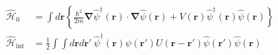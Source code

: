 \documentclass[dvipdfmx, 11pt, a4paper]{jsarticle}
\theoremstyle{definition}
\numberwithin{equation}{section}
\begin{document}
    \begin{definition}[第二量子化ハミルトニアン]
        \begin{equation}
            \begin{aligned}
                \hat{\mathscr{H}}_0 &= \int d\bm{r}\left\{ \frac{\hbar^2}{2m} \bm{\nabla}\hat{\psi}^\dagger(\bm{r})\cdot \bm{\nabla}\hat{\psi}(\bm{r}) + V(\bm{r}) \hat{\psi}^\dagger(\bm{r})\hat{\psi}(\bm{r}) \right\}\\
                \hat{\mathscr{H}}_{\text{int}} &= \frac{1}{2} \int \int d\bm{r}d\bm{r}'\ \hat{\psi}^\dagger (\bm{r})\hat{\psi}(\bm{r}') U(\bm{r}-\bm{r}')\hat{\psi}(\bm{r}')\hat{\psi}(\bm{r})
            \end{aligned}
            \label{DaiNIryouSikaHmiru}
        \end{equation}
    \end{definition}
\end{document}
